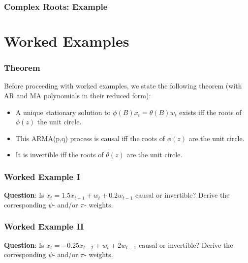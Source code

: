 \documentclass[%
xcolor=pdftex]{beamer}
\begin{document}
\begin{frame}
\frametitle{Complex Roots: Example}


\end{frame}

\section{Worked Examples}
\frame{\tableofcontents[currentsection]}

\begin{frame}
\frametitle{Theorem}

Before proceeding with worked examples, we state the following theorem (with AR and MA polynomials in their reduced form):

\begin{itemize}
\item A unique stationary solution to $\phi(B) x_t = \theta(B) w_t$ exists iff the roots of $\phi(z)$ \underline{\hspace{9 mm}} the unit circle.

\item This ARMA(p,q) process is causal iff the roots of $\phi(z)$ are \underline{\hspace{13 mm}} the unit circle.

\item It is invertible iff the roots of $\theta(z)$ are \underline{\hspace{13 mm}} the unit circle.
\end{itemize}
\end{frame}

\begin{frame}
\frametitle{Worked Example I}

\textbf{Question}: Is $x_t = 1.5x_{t-1} + w_t + 0.2 w_{t-1}$ causal or invertible? Derive the corresponding $\psi$- and/or $\pi$- weights.

\vspace{50mm}

\end{frame}

\begin{frame}
\frametitle{Worked Example II}

\textbf{Question}: Is $x_t = -0.25x_{t-2} + w_t + 2 w_{t-1}$ causal or invertible? Derive the corresponding $\psi$- and/or $\pi$- weights.

\vspace{50mm}



\end{frame}






\end{document}
